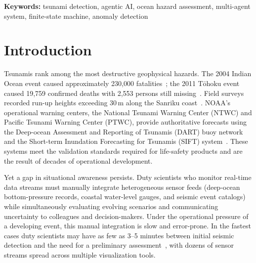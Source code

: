 \documentclass{article}
\begin{document}
\begin{abstract}
tier ($T_3{=}0.85$) in three of the five events and a lower tier
in Iquique (ASSESS) and Samoa (INVESTIGATE);
standard-mode stations (15-min sampling) score at or near zero.
Those stations are filter-degraded by the Nyquist criterion, and all
but one are also too distant for either coseismic deformation or
tsunami arrival to fall inside the six-hour evaluation window.  For
that one the predicted arrival lands after its last sample, so the low
scores cannot be attributed to sampling rate alone.  All five events
were available during development, so this is a retrospective
consistency check rather than a held-out test.
The earliest detections (2.7\,min post-earthquake) correspond to
coseismic seafloor deformation, not the tsunami wave itself;
actual tsunami arrivals appear on longer timescales depending on
source--station distance.
The complete implementation is publicly available under a
noncommercial license.\footnotemark[1]
\end{abstract}

\noindent\textbf{Keywords:}
tsunami detection, agentic AI, ocean hazard assessment,
multi-agent system, finite-state machine, anomaly detection


\section{Introduction}

Tsunamis rank among the most destructive geophysical hazards. The 2004
Indian Ocean event caused approximately 230,000
fatalities~\citep{synolakis2006tsunami}; the 2011
T\={o}hoku event caused 19,759 confirmed deaths with 2,553 persons still missing~\citep{npa2023tohoku}. Field surveys recorded
run-up heights exceeding 30\,m along the Sanriku coast~\citep{mori2011survey}. NOAA's operational warning
centers, the National Tsunami Warning Center (NTWC) and Pacific Tsunami
Warning Center (PTWC), provide authoritative forecasts using the
Deep-ocean Assessment and Reporting of Tsunamis (DART) buoy
network~\citep{bernard2011history} and the Short-term Inundation
Forecasting for Tsunamis (SIFT) system~\citep{titov2005realtime,
gica2008development}. These systems meet the validation standards required for life-safety
products and are the result of decades of operational development.

Yet a gap in situational awareness persists. Duty
scientists who monitor real-time data streams must manually integrate
heterogeneous sensor feeds (deep-ocean bottom-pressure records, coastal
water-level gauges, and seismic event catalogs) while simultaneously
evaluating evolving scenarios and communicating uncertainty to colleagues
and decision-makers. Under the operational pressure of a developing event, this manual
integration is slow and error-prone. In the fastest cases duty
scientists may have as few as 3--5 minutes between initial seismic
detection and the need for a preliminary
assessment~\citep{bernard2015evolution}, with dozens of sensor streams
spread across multiple visualization tools.
\end{document}
